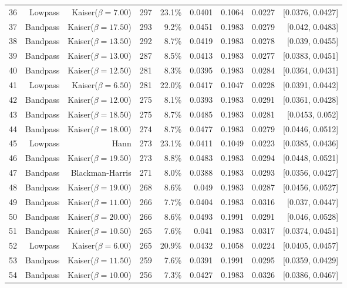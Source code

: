 \begin{longtable}{lrrrrrrrr}
    36 & Lowpass & Kaiser($\beta=7.00$) & 297 & 23.1\% & 0.0401 & 0.1064 & 0.0227 & [0.0376, 0.0427] \\
    37 & Bandpass & Kaiser($\beta=17.50$) & 293 & 9.2\% & 0.0451 & 0.1983 & 0.0279 & [0.042, 0.0483] \\
    38 & Bandpass & Kaiser($\beta=13.50$) & 292 & 8.7\% & 0.0419 & 0.1983 & 0.0278 & [0.039, 0.0455] \\
    39 & Bandpass & Kaiser($\beta=13.00$) & 287 & 8.5\% & 0.0413 & 0.1983 & 0.0277 & [0.0383, 0.0451] \\
    40 & Bandpass & Kaiser($\beta=12.50$) & 281 & 8.3\% & 0.0395 & 0.1983 & 0.0284 & [0.0364, 0.0431] \\
    41 & Lowpass & Kaiser($\beta=6.50$) & 281 & 22.0\% & 0.0417 & 0.1047 & 0.0228 & [0.0391, 0.0442] \\
    42 & Bandpass & Kaiser($\beta=12.00$) & 275 & 8.1\% & 0.0393 & 0.1983 & 0.0291 & [0.0361, 0.0428] \\
    43 & Bandpass & Kaiser($\beta=18.50$) & 275 & 8.7\% & 0.0485 & 0.1983 & 0.0281 & [0.0453, 0.052] \\
    44 & Bandpass & Kaiser($\beta=18.00$) & 274 & 8.7\% & 0.0477 & 0.1983 & 0.0279 & [0.0446, 0.0512] \\
    45 & Lowpass & Hann & 273 & 23.1\% & 0.0411 & 0.1049 & 0.0223 & [0.0385, 0.0436] \\
    46 & Bandpass & Kaiser($\beta=19.50$) & 273 & 8.8\% & 0.0483 & 0.1983 & 0.0294 & [0.0448, 0.0521] \\
    47 & Bandpass & Blackman-Harris & 271 & 8.0\% & 0.0388 & 0.1983 & 0.0293 & [0.0356, 0.0427] \\
    48 & Bandpass & Kaiser($\beta=19.00$) & 268 & 8.6\% & 0.049 & 0.1983 & 0.0287 & [0.0456, 0.0527] \\
    49 & Bandpass & Kaiser($\beta=11.00$) & 266 & 7.7\% & 0.0404 & 0.1983 & 0.0316 & [0.037, 0.0447] \\
    50 & Bandpass & Kaiser($\beta=20.00$) & 266 & 8.6\% & 0.0493 & 0.1991 & 0.0291 & [0.046, 0.0528] \\
    51 & Bandpass & Kaiser($\beta=10.50$) & 265 & 7.6\% & 0.041 & 0.1983 & 0.0317 & [0.0374, 0.0451] \\
    52 & Lowpass & Kaiser($\beta=6.00$) & 265 & 20.9\% & 0.0432 & 0.1058 & 0.0224 & [0.0405, 0.0457] \\
    53 & Bandpass & Kaiser($\beta=11.50$) & 259 & 7.6\% & 0.0391 & 0.1991 & 0.0295 & [0.0359, 0.0429] \\
    54 & Bandpass & Kaiser($\beta=10.00$) & 256 & 7.3\% & 0.0427 & 0.1983 & 0.0326 & [0.0386, 0.0467] \\

\end{longtable}
